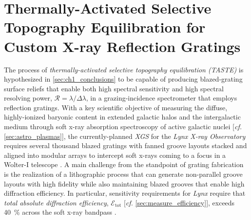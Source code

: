\chapter[Thermally-Activated Selective Topography Equilibration (TASTE) for Custom X-ray Reflection Gratings]{Thermally-Activated Selective \\Topography Equilibration for \\Custom X-ray Reflection Gratings}\label{ch:master_fab} 
The process of \emph{thermally-activated selective topography equilibration (TASTE)} \cite{Schleunitz14} is hypothesized in \cref{sec:ch1_conclusions} to be capable of producing blazed-grating surface reliefs that enable both high spectral sensitivity and high spectral resolving power, $\mathscr{R} = \lambda / \Delta \lambda$, in a grazing-incidence spectrometer that employs reflection gratings. 
With a key scientific objective of measuring the diffuse, highly-ionized baryonic content in extended galactic halos and the intergalactic medium through soft x-ray absorption spectroscopy of active galactic nuclei [\emph{cf.\@} \cref{sec:astro_plasmas}], the currently-planned \emph{XGS} for the \emph{Lynx X-ray Observatory} requires several thousand blazed gratings with fanned groove layouts stacked and aligned into modular arrays to intercept soft x-rays coming to a focus in a Wolter-I telescope \cite{Lynx_web,Gaskin19,McEntaffer19}. 
A main challenge from the standpoint of grating fabrication is the realization of a lithographic process that can generate non-parallel groove layouts with high fidelity while also maintaining blazed grooves that enable high diffraction efficiency. 
In particular, sensitivity requirements for \emph{Lynx} require that \emph{total absolute diffraction efficiency}, $\mathscr{E}_{\text{tot}}$ [\emph{cf.\@} \cref{sec:measure_efficiency}], exceeds \SI{40}{\percent} across the soft x-ray bandpass \cite{McEntaffer19}. 

